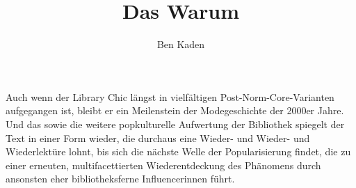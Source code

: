 \documentclass[output=paper]{langsci/langscibook}
\title{Das Warum}
\author{Ben Kaden}
\begin{document}
\maketitle

\noindent Auch wenn der Library Chic längst in vielfältigen Post-Norm-Core-Varianten aufgegangen ist, bleibt er ein Meilenstein der Modegeschichte der 2000er Jahre. Und das sowie die weitere popkulturelle Aufwertung der Bibliothek spiegelt der Text in einer Form wieder, die durchaus eine Wieder- und Wieder- und Wiederlektüre lohnt, bis sich die nächste Welle der Popularisierung findet, die zu einer erneuten, multifacettierten Wiederentdeckung des Phänomens durch ansonsten eher bibliotheksferne Influencer\*innen führt.
\end{document}
